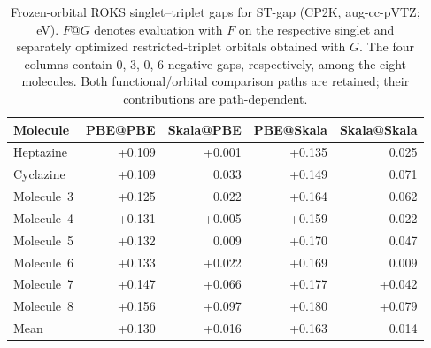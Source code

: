 \begin{table}[htbp]
\centering
\caption{Frozen-orbital ROKS singlet--triplet gaps for ST-gap (CP2K, aug-cc-pVTZ; eV). $F@G$ denotes evaluation with $F$ on the respective singlet and separately optimized restricted-triplet orbitals obtained with $G$. The four columns contain 0, 3, 0, 6 negative gaps, respectively, among the eight molecules. Both functional/orbital comparison paths are retained; their contributions are path-dependent.}
\label{tab:si_roks_frozen_orbitals}
\footnotesize
\setlength{\tabcolsep}{5pt}
\begin{tabular}{@{}lrrrr@{}}
\hline\hline
Molecule & PBE@PBE & Skala@PBE & PBE@Skala & Skala@Skala \\
\hline
Heptazine & +0.109 & +0.001 & +0.135 & \textminus{}0.025 \\
Cyclazine & +0.109 & \textminus{}0.033 & +0.149 & \textminus{}0.071 \\
Molecule~3 & +0.125 & \textminus{}0.022 & +0.164 & \textminus{}0.062 \\
Molecule~4 & +0.131 & +0.005 & +0.159 & \textminus{}0.022 \\
Molecule~5 & +0.132 & \textminus{}0.009 & +0.170 & \textminus{}0.047 \\
Molecule~6 & +0.133 & +0.022 & +0.169 & \textminus{}0.009 \\
Molecule~7 & +0.147 & +0.066 & +0.177 & +0.042 \\
Molecule~8 & +0.156 & +0.097 & +0.180 & +0.079 \\
\hline
Mean & +0.130 & +0.016 & +0.163 & \textminus{}0.014 \\
\hline\hline
\end{tabular}
\end{table}
